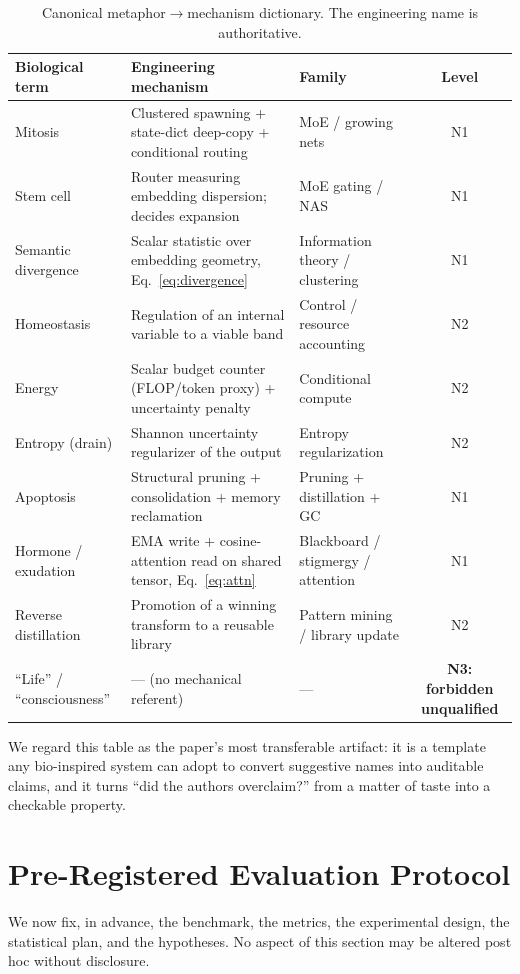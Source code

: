 \documentclass[11pt]{article}
\begin{document}
\begin{table}[t]
\centering
\caption{Canonical metaphor$\rightarrow$mechanism dictionary. The engineering
name is authoritative.}
\label{tab:dict}
\small
\begin{tabular}{@{}p{2.7cm}p{6.4cm}p{3.0cm}c@{}}
\toprule
\textbf{Biological term} & \textbf{Engineering mechanism} & \textbf{Family} & \textbf{Level}\\
\midrule
Mitosis & Clustered spawning + state-dict deep-copy + conditional routing & MoE / growing nets & N1\\
Stem cell & Router measuring embedding dispersion; decides expansion & MoE gating / NAS & N1\\
Semantic divergence & Scalar statistic over embedding geometry, Eq.~\eqref{eq:divergence} & Information theory / clustering & N1\\
Homeostasis & Regulation of an internal variable to a viable band & Control / resource accounting & N2\\
Energy & Scalar budget counter (FLOP/token proxy) + uncertainty penalty & Conditional compute & N2\\
Entropy (drain) & Shannon uncertainty regularizer of the output & Entropy regularization & N2\\
Apoptosis & Structural pruning + consolidation + memory reclamation & Pruning + distillation + GC & N1\\
Hormone / exudation & EMA write + cosine-attention read on shared tensor, Eq.~\eqref{eq:attn} & Blackboard / stigmergy / attention & N1\\
Reverse distillation & Promotion of a winning transform to a reusable library & Pattern mining / library update & N2\\
``Life'' / ``consciousness'' & --- (no mechanical referent) & --- & \textbf{N3: forbidden unqualified}\\
\bottomrule
\end{tabular}
\end{table}

We regard this table as the paper's most transferable artifact: it is a template
any bio-inspired system can adopt to convert suggestive names into auditable
claims, and it turns ``did the authors overclaim?'' from a matter of taste into a
checkable property.

\section{Pre-Registered Evaluation Protocol}
\label{sec:protocol}
We now fix, in advance, the benchmark, the metrics, the experimental design, the
statistical plan, and the hypotheses. No aspect of this section may be altered
post hoc without disclosure.
\end{document}
